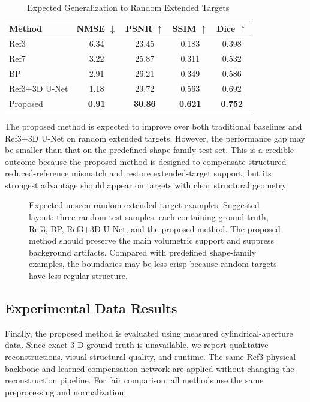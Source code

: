 \documentclass[journal]{IEEEtran}
\begin{document}
\begin{table}[t]
\caption{Expected Generalization to Random Extended Targets}
\label{tab:random_et_generalization}
\centering
\begin{tabular}{lcccc}
\hline
Method & NMSE $\downarrow$ & PSNR $\uparrow$ & SSIM $\uparrow$ & Dice $\uparrow$ \\
\hline
Ref3 & 6.34 & 23.45 & 0.183 & 0.398 \\
Ref7 & 3.22 & 25.87 & 0.311 & 0.532 \\
BP & 2.91 & 26.21 & 0.349 & 0.586 \\
Ref3+3D U-Net & 1.18 & 29.72 & 0.563 & 0.692 \\
Proposed & \textbf{0.91} & \textbf{30.86} & \textbf{0.621} & \textbf{0.752} \\
\hline
\end{tabular}
\end{table}

The proposed method is expected to improve over both traditional baselines and Ref3+3D U-Net on random extended targets. However, the performance gap may be smaller than that on the predefined shape-family test set. This is a credible outcome because the proposed method is designed to compensate structured reduced-reference mismatch and restore extended-target support, but its strongest advantage should appear on targets with clear structural geometry.

\begin{figure}[t]
\centering
{}
\caption{Expected unseen random extended-target examples. Suggested layout: three random test samples, each containing ground truth, Ref3, BP, Ref3+3D U-Net, and the proposed method. The proposed method should preserve the main volumetric support and suppress background artifacts. Compared with predefined shape-family examples, the boundaries may be less crisp because random targets have less regular structure.}
\label{fig:unseen_random_et}
\end{figure}

\subsection{Experimental Data Results}
\label{subsec:experimental_results}

Finally, the proposed method is evaluated using measured cylindrical-aperture data. Since exact 3-D ground truth is unavailable, we report qualitative reconstructions, visual structural quality, and runtime. The same Ref3 physical backbone and learned compensation network are applied without changing the reconstruction pipeline. For fair comparison, all methods use the same preprocessing and normalization.
\end{document}
